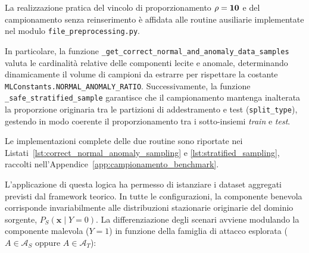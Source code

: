 La realizzazione pratica del vincolo di proporzionamento $\bf{\rho = 10}$ e del campionamento senza reinserimento è affidata alle routine ausiliarie implementate nel modulo \texttt{file\_preprocessing.py}. 

In particolare, la funzione \texttt{\_get\_correct\_normal\_and\_anomaly\_data\_samples} valuta le cardinalità relative delle componenti lecite e anomale, determinando dinamicamente il volume di campioni da estrarre per rispettare la costante \texttt{MLConstants.NORMAL\_ANOMALY\_RATIO}. 
Successivamente, la funzione \texttt{\_safe\_stratified\_sample} garantisce che il campionamento mantenga inalterata la proporzione originaria tra le partizioni di addestramento e test (\texttt{split\_type}), gestendo in modo coerente il proporzionamento tra i sotto-insiemi \textit{train} e \textit{test}.

Le implementazioni complete delle due routine sono riportate nei Listati~\ref{lst:correct_normal_anomaly_sampling} e \ref{lst:stratified_sampling}, raccolti nell'Appendice~\ref{app:campionamento_benchmark}.

L'applicazione di questa logica ha permesso di istanziare i dataset aggregati previsti dal framework teorico. 
In tutte le configurazioni, la componente benevola corrisponde invariabilmente alle distribuzioni stazionarie originarie del dominio sorgente, $P_S(\mathbf{x} \mid Y = 0)$. 
La differenziazione degli scenari avviene modulando la componente malevola ($Y=1$) in funzione della famiglia di attacco esplorata ($A \in \mathcal{A}_S$ oppure $A \in \mathcal{A}_T$):

